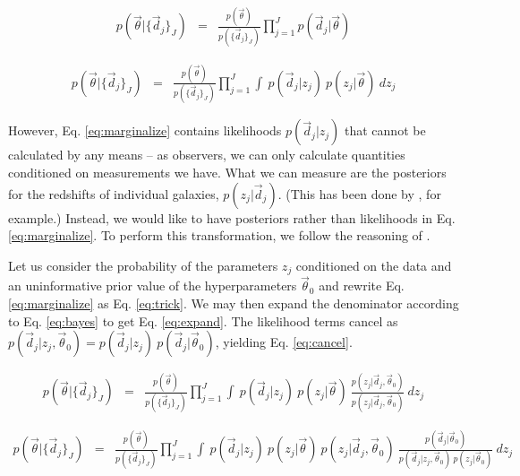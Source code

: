 \documentclass[12pt, onecolumn]{emulateapj}
\begin{document}
\begin{eqnarray}
\label{eq:posterior}
p(\vec{\theta}|\{\vec{d}_{j}\}_{J}) &=& \frac{p(\vec{\theta})}{p(\{\vec{d}_{j}\}_{J})}\prod_{j=1}^{J}p(\vec{d}_{j}|\vec{\theta})
\end{eqnarray}

\begin{eqnarray}
\label{eq:marginalize}
p(\vec{\theta}|\{\vec{d}_{j}\}_{J}) &=& \frac{p(\vec{\theta})}{p(\{\vec{d}_{j}\}_{J})}\prod_{j=1}^{J}\int\ p(\vec{d}_{j}|z_{j})\ p(z_{j}|\vec{\theta})\ dz_{j}
\end{eqnarray}

However, Eq. \ref{eq:marginalize} contains likelihoods $p(\vec{d}_{j}|z_{j})$ that cannot be calculated by any means -- as observers, we can only calculate quantities conditioned on measurements we have.  What we can measure are the posteriors for the redshifts of individual galaxies, $p(z_{j}|\vec{d}_{j})$.  (This has been done by \citet{she11}, for example.)  Instead, we would like to have posteriors rather than likelihoods in Eq. \ref{eq:marginalize}.  To perform this transformation, we follow the reasoning of \citet{mar15}.  

Let us consider the probability of the parameters $z_{j}$ conditioned on the data and an uninformative prior value of the hyperparameters $\vec{\theta}_{0}$ and rewrite Eq. \ref{eq:marginalize} as Eq. \ref{eq:trick}.  We may then expand the denominator according to Eq. \ref{eq:bayes} to get Eq. \ref{eq:expand}.  The likelihood terms cancel as $p(\vec{d}_{j}|z_{j},\vec{\theta}_{0})=p(\vec{d}_{j}|z_{j})\ p(\vec{d}_{j}|\vec{\theta}_{0})$, yielding Eq. \ref{eq:cancel}.

\begin{eqnarray}
\label{eq:trick}
p(\vec{\theta}|\{\vec{d}_{j}\}_{J}) &=& \frac{p(\vec{\theta})}{p(\{\vec{d}_{j}\}_{J})}\prod_{j=1}^{J}\int\ p(\vec{d}_{j}|z_{j})\ p(z_{j}|\vec{\theta})\ \frac{p(z_{j}|\vec{d}_{j},\vec{\theta}_{0})}{p(z_{j}|\vec{d}_{j},\vec{\theta}_{0})}\ dz_{j}
\end{eqnarray}

\begin{eqnarray}
\label{eq:expand}
p(\vec{\theta}|\{\vec{d}_{j}\}_{J}) &=& \frac{p(\vec{\theta})}{p(\{\vec{d}_{j}\}_{J})}\prod_{j=1}^{J}\int\ p(\vec{d}_{j}|z_{j})\ p(z_{j}|\vec{\theta})\ p(z_{j}|\vec{d}_{j},\vec{\theta}_{0})\ \frac{p(\vec{d}_{j}|\vec{\theta}_{0})}{p(\vec{d}_{j}|z_{j},\vec{\theta}_{0})\ p(z_{j}|\vec{\theta}_{0})}\ dz_{j}
\end{eqnarray}
\end{document}
